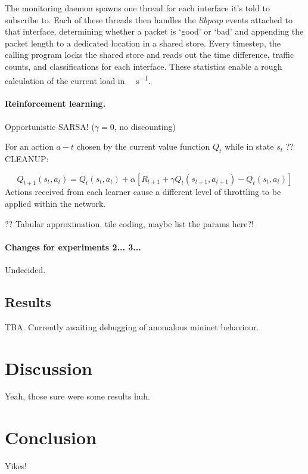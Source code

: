 \documentclass[10pt, a4paper]{article}
\begin{document}
The monitoring daemon spawns one thread for each interface it's told to subscribe to.
Each of these threads then handles the \emph{libpcap} events attached to that interface, determining whether a packet is `good' or `bad' and appending the packet length to a dedicated location in a shared store.
Every timestep, the calling program locks the shared store and reads out the time difference, traffic counts, and classifications for each interface.
These statistics enable a rough calculation of the current load in \si{\mega\bit\per\second}.

\paragraph{Reinforcement learning.} Opportunistic SARSA! ($\gamma = 0$, no discounting)

For an action $a-t$ chosen by the current value function $Q_t$ while in state $s_t$ ??CLEANUP:

$$ Q_{t+1}(s_t,a_t) = Q_t(s_t,a_t) + \alpha [R_{t+1} + \gamma Q_t(s_{t+1},a_{t+1}) - Q_t(s_t,a_t)] $$
Actions received from each learner cause a different level of throttling to be applied within the network.

?? Tabular approximation, tile coding, maybe list the params here?!

\paragraph{Changes for experiments 2... 3...} Undecided.

\subsection{Results}

TBA. Currently awaiting debugging of anomalous mininet behaviour.

\section{Discussion}

Yeah, those sure were some results huh.

\section{Conclusion}

Yikes!

\printbibliography
\end{document}
